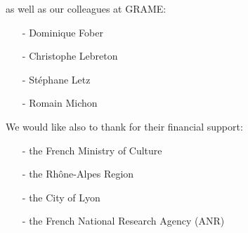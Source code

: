 as well as our colleagues at GRAME:
\begin{itemize}
\setlength\itemsep{0em}
\item[-]Dominique Fober
\item[-]Christophe Lebreton
\item[-]Stéphane Letz
\item[-]Romain Michon
\end{itemize}

We would like also to thank for their financial support:
\begin{itemize}
\setlength\itemsep{0em}
\item[-]the French Ministry of Culture
\item[-]the Rhône-Alpes Region
\item[-]the City of Lyon
\item[-]the French National Research Agency (\textsc{ANR})
\end{itemize}


